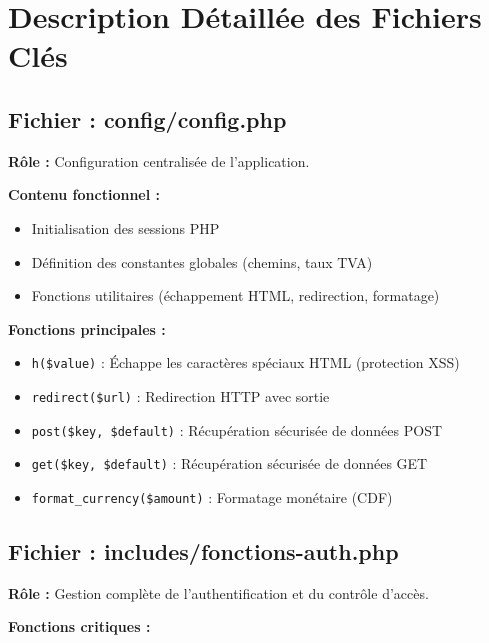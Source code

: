\documentclass[12pt,a4paper]{report}
\begin{document}
\section{Description Détaillée des Fichiers Clés}

\subsection{Fichier : config/config.php}

\textbf{Rôle :} Configuration centralisée de l'application.

\textbf{Contenu fonctionnel :}
\begin{itemize}
    \item Initialisation des sessions PHP
    \item Définition des constantes globales (chemins, taux TVA)
    \item Fonctions utilitaires (échappement HTML, redirection, formatage)
\end{itemize}

\textbf{Fonctions principales :}
\begin{itemize}
    \item \texttt{h(\$value)} : Échappe les caractères spéciaux HTML (protection XSS)
    \item \texttt{redirect(\$url)} : Redirection HTTP avec sortie
    \item \texttt{post(\$key, \$default)} : Récupération sécurisée de données POST
    \item \texttt{get(\$key, \$default)} : Récupération sécurisée de données GET
    \item \texttt{format\_currency(\$amount)} : Formatage monétaire (CDF)
\end{itemize}

\subsection{Fichier : includes/fonctions-auth.php}

\textbf{Rôle :} Gestion complète de l'authentification et du contrôle d'accès.

\textbf{Fonctions critiques :}
\end{document}
